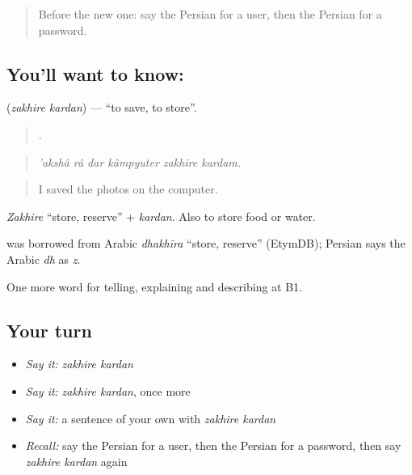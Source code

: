 \label{lesson:FA-C416-zakhire-kardan}



\begin{quote}
Before the new one: say the Persian for a user, then the Persian for a password.
\end{quote}

\subsection*{You'll want to know:  }
\textbf{ } (\emph{zakhire kardan}) — \textquotedblleft{}to save, to store\textquotedblright{}.

\begin{quote}
     .
\end{quote}

\begin{quote}
\emph{'akshâ râ dar kâmpyuter zakhire kardam.}
\end{quote}

\begin{quote}
I saved the photos on the computer.
\end{quote}

\emph{Zakhire} \textquotedblleft{}store, reserve\textquotedblright{} + \emph{kardan}. Also to store food or water.

\begin{cousinweb}
\textbf{} was borrowed from Arabic \emph{dhakhīra} \textquotedblleft{}store, reserve\textquotedblright{} (EtymDB); Persian says the Arabic \emph{dh} as \emph{z}.
\end{cousinweb}

\begin{grammarlens}[title={What you've built}]
One more word for telling, explaining and describing at B1.
\end{grammarlens}

\subsection*{Your turn}
\begin{itemize}
\raggedright
  \item \emph{Say it:} \emph{zakhire kardan}
  \item \emph{Say it:} \emph{zakhire kardan}, once more
  \item \emph{Say it:} a sentence of your own with \emph{zakhire kardan}
  \item \emph{Recall:} say the Persian for a user, then the Persian for a password, then say \emph{zakhire kardan} again
\end{itemize}

